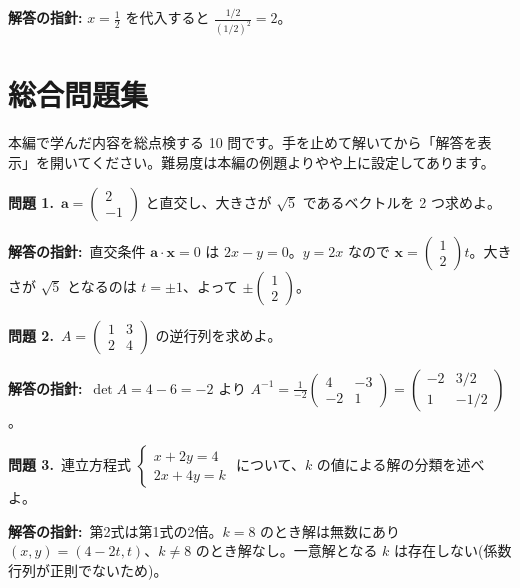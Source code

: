 \documentclass{article}
\begin{document}
\textbf{解答の指針:} \(x = \frac{1}{2}\) を代入すると \(\frac{1/2}{(1/2)^2} = 2\)。

\section{総合問題集}

本編で学んだ内容を総点検する 10 問です。手を止めて解いてから「解答を表示」を開いてください。難易度は本編の例題よりやや上に設定してあります。

\textbf{問題 1.}\ \(\boldsymbol{a} = \begin{pmatrix} 2 \\ -1 \end{pmatrix}\) と直交し、大きさが \(\sqrt{5}\) であるベクトルを 2 つ求めよ。

\textbf{解答の指針:}\ 直交条件 \(\boldsymbol{a} \cdot \boldsymbol{x} = 0\) は \(2x - y = 0\)。\(y = 2x\) なので \(\boldsymbol{x} = \begin{pmatrix} 1 \\ 2 \end{pmatrix} t\)。大きさが \(\sqrt{5}\) となるのは \(t = \pm 1\)、よって \(\pm\begin{pmatrix} 1 \\ 2 \end{pmatrix}\)。

\textbf{問題 2.}\ \(A = \begin{pmatrix} 1 & 3 \\ 2 & 4 \end{pmatrix}\) の逆行列を求めよ。

\textbf{解答の指針:}\ \(\det A = 4 - 6 = -2\) より \(A^{-1} = \frac{1}{-2}\begin{pmatrix} 4 & -3 \\ -2 & 1 \end{pmatrix} = \begin{pmatrix} -2 & 3/2 \\ 1 & -1/2 \end{pmatrix}\)。

\textbf{問題 3.}\ 連立方程式 \(\begin{cases} x + 2y = 4 \\ 2x + 4y = k \end{cases}\) について、\(k\) の値による解の分類を述べよ。

\textbf{解答の指針:}\ 第2式は第1式の2倍。\(k = 8\) のとき解は無数にあり \((x, y) = (4 - 2t, t)\)、\(k \neq 8\) のとき解なし。一意解となる \(k\) は存在しない(係数行列が正則でないため)。
\end{document}
